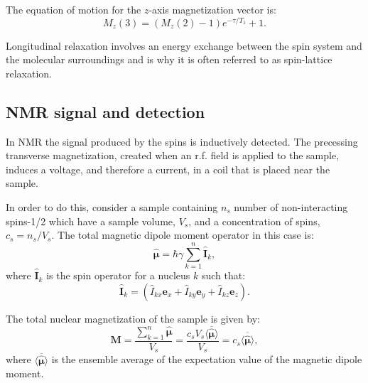 The equation of motion for the $z$-axis magnetization vector is:
\begin{equation}
  M_z(3) = (M_z(2) - 1)e^{-\tau/T_1} + 1.
\end{equation}

Longitudinal relaxation involves an energy exchange between the spin system and the molecular
surroundings and is why it is often referred to as spin-lattice relaxation.

\subsection{NMR signal and detection}\label{Signal}

In NMR the signal produced by the spins is inductively detected. The precessing transverse magnetization, created
when an r.f. field is applied to the sample, induces a voltage, and therefore a current, in a coil that
is placed near the sample.

In order to do this, consider a sample containing $n_s$ number of non-interacting spins-1/2 which have a
sample volume, $V_s$, and a concentration of spins, $c_s = n_s/V_s$.
The total magnetic dipole moment operator in this case is:
\begin{equation}\label{eqn:MagneticMoment}
  \hat{\pmb{\mu}} = \hbar\gamma\sum_{k=1}^n\mathbf{\hat{I}}_k,
\end{equation}
where $\mathbf{\hat{I}}_k$ is the spin operator for a nucleus $k$ such that:
\begin{equation}
  \mathbf{\hat{I}}_k = (\hat{I}_{kx}\mathbf{e}_x + \hat{I}_{ky}\mathbf{e}_y + \hat{I}_{kz}\mathbf{e}_z).
\end{equation}

The total nuclear magnetization of the sample is given by:
\begin{equation}\label{eqn:magnetization}
  \mathbf{M} = \frac{\sum_{k=1}^n\hat{\pmb{\mu}}}{V_s} = \frac{c_sV_s\langle\overbar{\hat{\pmb{\mu}}}\rangle}{V_s} = c_s\langle\overbar{\hat{\pmb{\mu}}}\rangle,
\end{equation}
where $\langle\overbar{\hat{\pmb{\mu}}}\rangle$ is the ensemble average of the expectation value of the magnetic dipole moment.

